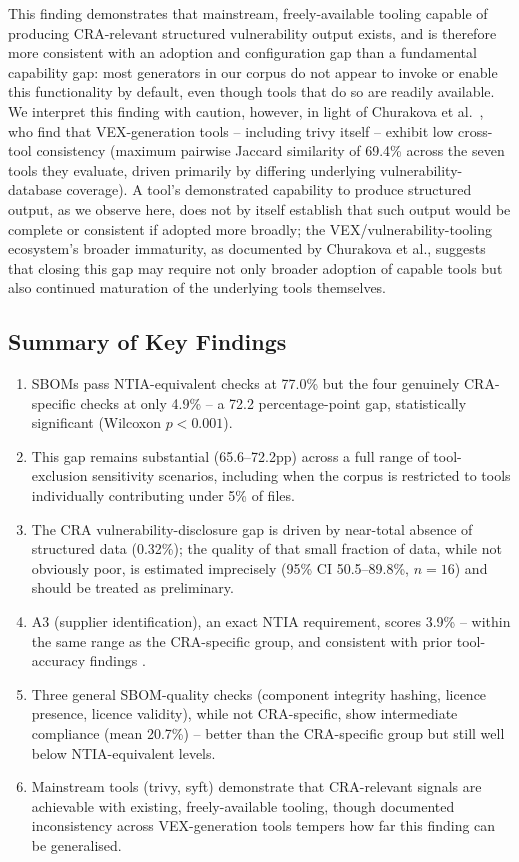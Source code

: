 \documentclass[11pt]{article}
\begin{document}
This finding demonstrates that mainstream, freely-available tooling capable of producing CRA-relevant structured vulnerability output exists, and is therefore more consistent with an adoption and configuration gap than a fundamental capability gap: most generators in our corpus do not appear to invoke or enable this functionality by default, even though tools that do so are readily available. We interpret this finding with caution, however, in light of Churakova et al.\ \cite{churakova2025}, who find that VEX-generation tools -- including trivy itself -- exhibit low cross-tool consistency (maximum pairwise Jaccard similarity of 69.4\% across the seven tools they evaluate, driven primarily by differing underlying vulnerability-database coverage). A tool's demonstrated capability to produce structured output, as we observe here, does not by itself establish that such output would be complete or consistent if adopted more broadly; the VEX/vulnerability-tooling ecosystem's broader immaturity, as documented by Churakova et al., suggests that closing this gap may require not only broader adoption of capable tools but also continued maturation of the underlying tools themselves.

\subsection{Summary of Key Findings}

\begin{enumerate}
\item SBOMs pass NTIA-equivalent checks at 77.0\% but the four genuinely CRA-specific checks at only 4.9\% -- a 72.2 percentage-point gap, statistically significant (Wilcoxon $p<0.001$).
\item This gap remains substantial (65.6--72.2pp) across a full range of tool-exclusion sensitivity scenarios, including when the corpus is restricted to tools individually contributing under 5\% of files.
\item The CRA vulnerability-disclosure gap is driven by near-total absence of structured data (0.32\%); the quality of that small fraction of data, while not obviously poor, is estimated imprecisely (95\% CI 50.5--89.8\%, $n=16$) and should be treated as preliminary.
\item A3 (supplier identification), an exact NTIA requirement, scores 3.9\% -- within the same range as the CRA-specific group, and consistent with prior tool-accuracy findings \cite{muneza2025,halbritter2024}.
\item Three general SBOM-quality checks (component integrity hashing, licence presence, licence validity), while not CRA-specific, show intermediate compliance (mean 20.7\%) -- better than the CRA-specific group but still well below NTIA-equivalent levels.
\item Mainstream tools (trivy, syft) demonstrate that CRA-relevant signals are achievable with existing, freely-available tooling, though documented inconsistency across VEX-generation tools \cite{churakova2025} tempers how far this finding can be generalised.
\end{enumerate}
\end{document}
